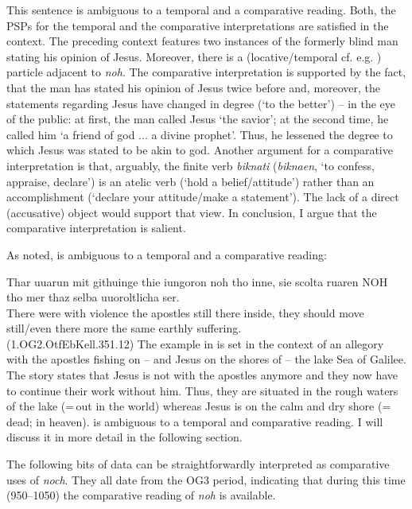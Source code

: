 \documentclass[output=paper]{langsci/langscibook}
\begin{document}
This sentence is ambiguous to a temporal and a comparative reading. Both, the PSPs for the temporal and the comparative interpretations are satisfied in the context. The preceding context features two instances of the formerly blind man stating his opinion of Jesus. Moreover, there is a (locative/temporal cf. e.g. \citealt{petrova2011}) particle adjacent to \textit{noh}. The comparative interpretation is supported by the fact, that the man has stated his opinion of Jesus twice before and, moreover, the statements regarding Jesus have changed in degree (`to the better') -- in the eye of the public: at first, the man called Jesus `the savior'; at the second time, he called him `a friend of god ... a divine prophet'. Thus, he lessened the degree to which Jesus was stated to be akin to god. Another argument for a comparative interpretation is that, arguably, the finite verb \textit{biknati} (\textit{biknaen}, `to confess, appraise, declare') is an atelic verb (`hold a belief/attitude') rather than an accomplishment (`declare your attitude/make a statement'). The lack of a direct (accusative) object would support that view. In conclusion, I argue that the comparative interpretation is salient.

As noted,  is ambiguous to a temporal and a comparative reading:

\ea\gll Thar uuarun mit githuinge thie iungoron noh tho inne, sie scolta ruaren NOH tho mer thaz selba uuoroltlicha ser.\\
       There were with violence the apostles still there inside, they should move still/even there more the same earthly suffering.\\
\label{OG2_noch_mehr_ruehren_first} \hfill (1.OG2.OtfEbKell.351.12)
\z
The example in  is set in the context of an allegory with the apostles fishing on -- and Jesus on the shores of -- the lake Sea of Galilee. The story states that Jesus is not with the apostles anymore and they now have to continue their work without him. Thus, they are situated in the rough waters of the lake (=\,out in the world) whereas Jesus is on the calm and dry shore (=\,dead; in heaven).  is ambiguous to a temporal and comparative reading. I will discuss it in more detail in the following section.

The following bits of data can be straightforwardly interpreted as comparative uses of \textit{noch}. They all date from the OG3 period, indicating that during this time (950--1050) the comparative reading of \textit{noh} is available.
\end{document}
